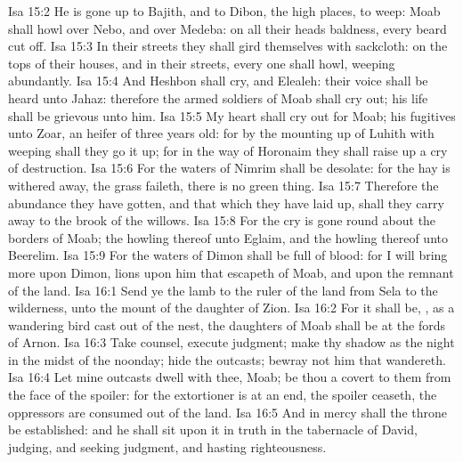 \vs Isa 15:2 He is gone up to Bajith, and to Dibon, the high places, to weep: Moab shall howl over Nebo, and over Medeba: on all their heads  baldness,  every beard cut off.
\vs Isa 15:3 In their streets they shall gird themselves with sackcloth: on the tops of their houses, and in their streets, every one shall howl, weeping abundantly.
\vs Isa 15:4 And Heshbon shall cry, and Elealeh: their voice shall be heard  unto Jahaz: therefore the armed soldiers of Moab shall cry out; his life shall be grievous unto him.
\vs Isa 15:5 My heart shall cry out for Moab; his fugitives  unto Zoar, an heifer of three years old: for by the mounting up of Luhith with weeping shall they go it up; for in the way of Horonaim they shall raise up a cry of destruction.
\vs Isa 15:6 For the waters of Nimrim shall be desolate: for the hay is withered away, the grass faileth, there is no green thing.
\vs Isa 15:7 Therefore the abundance they have gotten, and that which they have laid up, shall they carry away to the brook of the willows.
\vs Isa 15:8 For the cry is gone round about the borders of Moab; the howling thereof unto Eglaim, and the howling thereof unto Beerelim.
\vs Isa 15:9 For the waters of Dimon shall be full of blood: for I will bring more upon Dimon, lions upon him that escapeth of Moab, and upon the remnant of the land.
\vs Isa 16:1 Send ye the lamb to the ruler of the land from Sela to the wilderness, unto the mount of the daughter of Zion.
\vs Isa 16:2 For it shall be, , as a wandering bird cast out of the nest,  the daughters of Moab shall be at the fords of Arnon.
\vs Isa 16:3 Take counsel, execute judgment; make thy shadow as the night in the midst of the noonday; hide the outcasts; bewray not him that wandereth.
\vs Isa 16:4 Let mine outcasts dwell with thee, Moab; be thou a covert to them from the face of the spoiler: for the extortioner is at an end, the spoiler ceaseth, the oppressors are consumed out of the land.
\vs Isa 16:5 And in mercy shall the throne be established: and he shall sit upon it in truth in the tabernacle of David, judging, and seeking judgment, and hasting righteousness.
